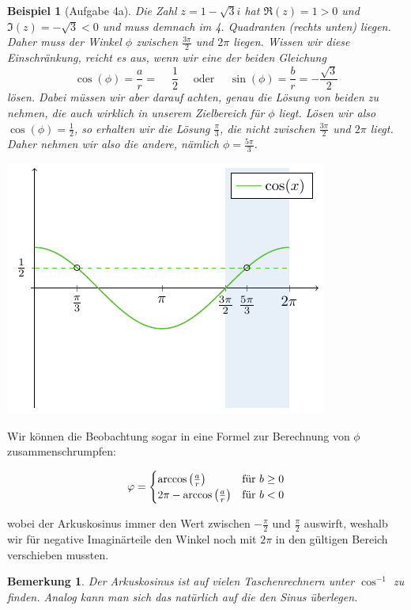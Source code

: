 \documentclass[ngerman, a4paper, 11pt]{article}
\newcounter{themcount}
\theoremstyle{nonumberplain}
\newtheorem{beispiel}{Beispiel}
\newtheorem{bemerkung}[themcount]{Bemerkung}
\renewcommand{\i}{i}
\begin{document}
	\begin{beispiel}[Aufgabe 4a]
		Die Zahl $z = 1 - \sqrt{3} \i$ hat $\Re(z) = 1 > 0$ und $\Im(z) = - \sqrt{3} < 0$ und muss demnach im 4. Quadranten (rechts unten) liegen. Daher muss der Winkel $\phi$ zwischen $\frac{3\pi}{2}$ und $2\pi$ liegen.
		Wissen wir diese Einschränkung, reicht es aus, wenn wir \textit{eine} der beiden Gleichung 
		\begin{equation*}
			\cos(\phi) = \frac{a}{r} = \phantom{-}\frac{1}{2} 
			\quad \text{ oder } \quad
			\sin(\phi) = \frac{b}{r}  = -\frac{\sqrt{3}}{2}
		\end{equation*}
		lösen. Dabei müssen wir aber darauf achten, genau die Lösung von beiden zu nehmen, die auch wirklich in unserem Zielbereich für $\phi$ liegt.
		Lösen wir also $\cos(\phi) = \frac{1}{2}$, so erhalten wir die Lösung $\frac{\pi}{3}$, die nicht zwischen $\frac{3\pi}{2}$ und $2\pi$ liegt. Daher nehmen wir also die andere, nämlich $\phi = \frac{5\pi}{3}$. 
		\begin{center}
			\includegraphics{tut01-umrechnungen-abb-winkelbereich}
		\end{center}
	\end{beispiel}
	
	Wir können die Beobachtung sogar in eine Formel zur Berechnung von $\phi$ zusammenschrumpfen:
	\begin{tcolorbox}[colback=cdorange!10,colframe=cdorange]
		\begin{equation*}
			\varphi = \begin{cases}
				\arccos\left( \frac{a}{r} \right) &\text{für } b \ge 0 \\
				2\pi - \arccos\left( \frac{a}{r} \right) &\text{für } b < 0 
			\end{cases}
		\end{equation*}
	\end{tcolorbox}
	wobei der Arkuskosinus immer den Wert zwischen $-\frac{\pi}{2}$ und $\frac{\pi}{2}$ auswirft, weshalb wir für negative Imaginärteile den Winkel noch mit $2\pi$ in den gültigen Bereich verschieben mussten. 
	
	\begin{bemerkung}
		Der Arkuskosinus ist auf vielen Taschenrechnern unter $\cos^{-1}$ zu finden. Analog kann man sich das natürlich auf die den Sinus überlegen.
	\end{bemerkung}
	
\end{document}
